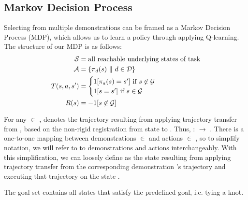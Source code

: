\subsection{Markov Decision Process}
Selecting from multiple demonstrations can be framed as a Markov Decision
Process (MDP), which allows us to learn a policy through applying Q-learning.
The structure of our MDP is as follows:
\begin{align*}
\mathcal{S}{} &=  \text{all reachable underlying states of task} \\
\mathcal{A}{} &= \{\pi_{d}(s)\ \| \text{ } d{} \in \mathcal{D}{}\} \\
T{}(s, a, s') &= \begin{cases}
                           1[\pi_{a}(s) = s'] \text{ if } s \not \in \mathcal{G}{} \\
                           1[s{} = s{}'] \text{ if } s \in \mathcal{G}{} \end{cases}\\
R(s) &= -1 {[ s{} \not \in \mathcal{G}{} ]} \\
\end{align*}

For any \demovar{} $\in$ \demoset{},  denotes the trajectory
resulting from applying trajectory transfer from , based
on the non-rigid registration from state  to \statevar{}.
Thus, \policyset{} : \transitionfn{}  \stateset{} $\rightarrow$
\stateset{}. There is a one-to-one mapping between demonstrations \demovar{}
$\in$ \demoset{} and actions \actionvar{} $\in$ \actionset{}, so to simplify
notation, we will refer to to demonstrations and actions interchangeably.
With this simplification, we can loosely define  as the
state resulting from applying trajectory transfer from the corresponding
demonstration \demovar{}'s trajectory and executing that trajectory on the
state \statevar{}.

The goal set \goalset{} contains all states that satisfy the
predefined goal, i.e. tying a knot.


